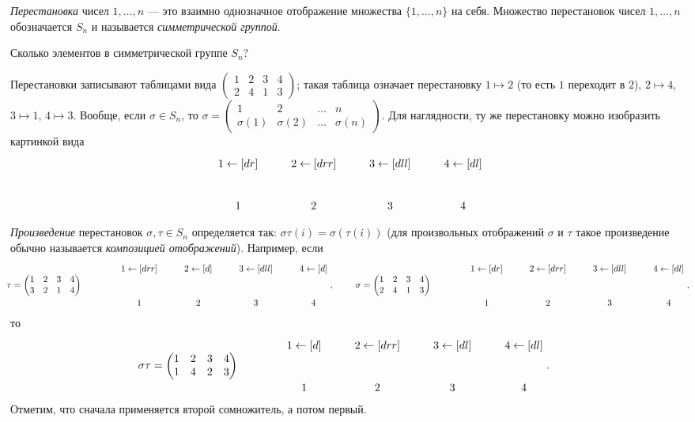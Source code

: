 \documentclass[a4paper, 11pt]{article}
\begin{document}


{}
\emph{Перестановка} чисел $1,\dots,n$ --- это взаимно
однозначное отображение множества $\{1,\dots,n\}$ на себя.
Множество перестановок чисел $1,\dots,n$ обозначается $S_n$ и
называется \emph{симметрической группой}.

Сколько элементов в симметрической группе $S_n$?

Перестановки записывают таблицами вида
$\displaystyle\begin{pmatrix}1&2&3&4\\2&4&1&3\end{pmatrix}$; такая
таблица означает перестановку $1\mapsto2$ (то есть $1$ переходит в
$2$), $2\mapsto4$, $3\mapsto1$, $4\mapsto3$. Вообще, если
$\sigma\in S_n$, то
$\displaystyle\sigma=\begin{pmatrix}1&2&\dots&n\\
\sigma(1)&\sigma(2)&\dots&\sigma(n)\end{pmatrix}$.
Для наглядности, ту же перестановку можно изобразить картинкой
вида
\vspace*{-2mm}
$$
\xymatrix{
1\ar[dr]&2\ar[drr]&3\ar[dll]&4\ar[dl]\\
1&2&3&4
}
$$
\vspace*{-5mm}

\emph{Произведение} перестановок $\sigma,\tau\in S_n$ определяется
так: $\sigma\tau(i)=\sigma(\tau(i))$ (для произвольных
отображений $\sigma$ и $\tau$ такое произведение обычно называется
\emph{композицией отображений}). Например, если
$$
\llap{$\tau$}=\begin{pmatrix}1&2&3&4\\3&2&1&4\end{pmatrix}
\qquad\qquad \raisebox{18pt}{$\xymatrix{
1\ar[drr]&2\ar[d]&3\ar[dll]&4\ar[d]\\
1&2&3&4 }$}
,\qquad\quad
\llap{$\sigma$}=\begin{pmatrix}1&2&3&4\\2&4&1&3\end{pmatrix}
\qquad\qquad \raisebox{18pt}{$\xymatrix{
1\ar[dr]&2\ar[drr]&3\ar[dll]&4\ar[dl]\\
1&2&3&4 }$}
,$$
\vspace*{-3mm}
то
\vspace*{-3mm}
$$
\llap{$\sigma\tau$}=\begin{pmatrix}1&2&3&4\\1&4&2&3\end{pmatrix}
\qquad\qquad \raisebox{18pt}{$\xymatrix{
1\ar[d]&2\ar[drr]&3\ar[dl]&4\ar[dl]\\
1&2&3&4 }$}.
$$
Отметим, что сначала применяется второй сомножитель, а потом
первый.
\end{document}
